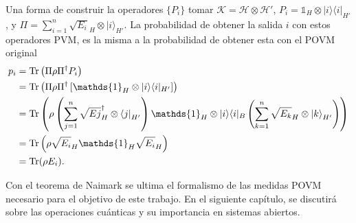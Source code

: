 Una forma de construir la operadores $\{P_i\}$ tomar
$\mathcal{K}=\mathcal{H}\otimes\mathcal{H'}$, $P _{i}=\mathds{1} _{H}\otimes
|i\rangle \langle i|_{H'}$, y
$\Pi=\sum _{i=1}^{n}{\sqrt {E_{i}} }_{H}\otimes {|i\rangle }_{H'}$. La
probabilidad de obtener la salida $i$ con estos operadores PVM, es la misma a
la probabilidad de obtener esta con el POVM original {\cite{2007geometry}}
\begin{equation}
 \begin{split}
 p_i&=\tr \left(\Pi\rho\Pi^{\dagger }P _{i}\right)\\
 &=\tr \left(\Pi\rho \Pi^{\dagger }\left[\mathds{1}_{H}\otimes |i\rangle \langle i|_{H'}\right]\right)\\
 &=\tr \left(\rho\left(\sum _{j=1}^{n}{\sqrt {E{j} }}_{H}^{\dagger }\otimes {\langle j|}_{H'}\right)\mathds{1} _{H}\otimes |i\rangle \langle i|_{B}\left(\sum _{k=1}^{n}{\sqrt {E_{k} }}_{H}\otimes {|k\rangle }_{H'}\right)\right)\\
 &=\tr \left(\rho {\sqrt {E_{i} }}_{H}\mathds{1} _{H}{\sqrt {E_{i} }}_{H}\right)\\
 &=\tr (\rho E_{i}).
 \end{split}
\end{equation}

Con el teorema de Naimark  se ultima el formalismo de las medidas POVM necesario para el objetivo de este trabajo. En el siguiente capítulo, se discutirá sobre las operaciones cuánticas y su importancia en sistemas abiertos.


